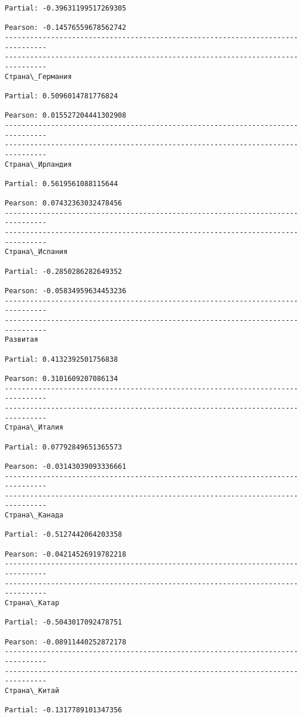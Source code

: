 \documentclass[11pt,mathletters]{article}
\begin{document}
\begin{Verbatim}[commandchars=\\\{\}]
Partial: -0.39631199517269305

Pearson: -0.14576559678562742
--------------------------------------------------------------------------------
--------------------------------------------------------------------------------
Страна\_Германия

Partial: 0.5096014781776824

Pearson: 0.015527204441302908
--------------------------------------------------------------------------------
--------------------------------------------------------------------------------
Страна\_Ирландия

Partial: 0.5619561088115644

Pearson: 0.07432363032478456
--------------------------------------------------------------------------------
--------------------------------------------------------------------------------
Страна\_Испания

Partial: -0.2850286282649352

Pearson: -0.05834959634453236
--------------------------------------------------------------------------------
--------------------------------------------------------------------------------
Развитая

Partial: 0.4132392501756838

Pearson: 0.3101609207086134
--------------------------------------------------------------------------------
--------------------------------------------------------------------------------
Страна\_Италия

Partial: 0.07792849651365573

Pearson: -0.03143039093336661
--------------------------------------------------------------------------------
--------------------------------------------------------------------------------
Страна\_Канада

Partial: -0.5127442064203358

Pearson: -0.04214526919782218
--------------------------------------------------------------------------------
--------------------------------------------------------------------------------
Страна\_Катар

Partial: -0.5043017092478751

Pearson: -0.08911440252872178
--------------------------------------------------------------------------------
--------------------------------------------------------------------------------
Страна\_Китай

Partial: -0.1317789101347356


\end{Verbatim}
\end{document}
